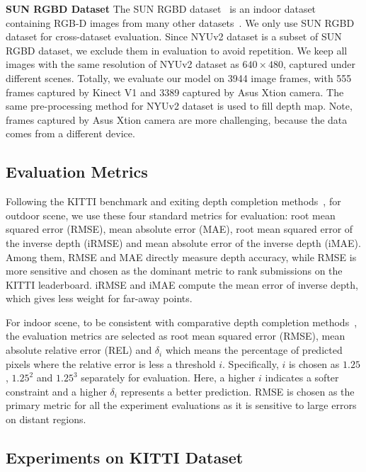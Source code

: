 \documentclass[journal]{IEEEtran}
\begin{document}
{\bf SUN RGBD Dataset}
The SUN RGBD dataset~\cite{sun_rgbd} is an indoor dataset containing RGB-D images from many other datasets~\cite{NYU_V2,B3DO,sun_3d}.
We only use SUN RGBD dataset for cross-dataset evaluation.
Since NYUv2 dataset is a subset of SUN RGBD dataset, we exclude them in evaluation to avoid repetition.
We keep all images with the same resolution of NYUv2 dataset as $640\times480$, captured under different scenes.
Totally, we evaluate our model on 3944 image frames, with 555 frames captured by Kinect V1 and 3389 captured by Asus Xtion camera.
The same pre-processing method for NYUv2 dataset is used to fill depth map.
Note, frames captured by Asus Xtion camera are more challenging, because the data comes from a different device.



\subsection{Evaluation Metrics} 
\label{subsec:metric}
Following the KITTI benchmark and exiting depth completion methods~\cite{depth_affinity, deep_lidar, self_supervised}, for outdoor scene,
we use these four standard metrics for evaluation:
root mean squared error (RMSE), mean absolute error (MAE), root mean squared error of the inverse depth (iRMSE) and mean absolute error of the inverse depth (iMAE).
Among them, RMSE and MAE directly measure depth accuracy, while RMSE is more sensitive and chosen as the dominant metric to rank submissions on the KITTI leaderboard. 
iRMSE and iMAE compute the mean error of inverse depth, which gives less weight for far-away points.

For indoor scene, to be consistent with comparative depth completion methods~\cite{depth_affinity, deep_lidar, self_supervised, cnn_confidence},
the evaluation metrics are selected as root mean squared error (RMSE), mean absolute relative error (REL) and
$\delta_{i}$ which means the percentage of predicted pixels where the relative error is less a threshold $i$.
Specifically, $i$ is chosen as $1.25$, $1.25^{2}$ and $1.25^{3}$ separately for evaluation.
Here, a higher $i$ indicates a softer constraint and a higher $\delta_{i}$ represents a better prediction.
RMSE is chosen as the primary metric for all the experiment evaluations as it is sensitive to large errors on distant regions.



\subsection{Experiments on KITTI Dataset}
\label{subsec:result_kitti}
\end{document}
